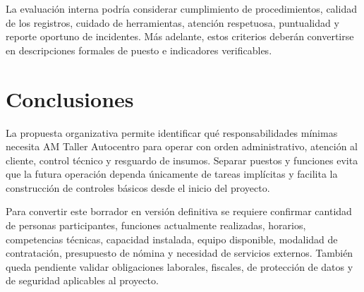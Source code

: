 {La evaluación interna podría considerar cumplimiento de procedimientos, calidad de los registros, cuidado de herramientas, atención respetuosa, puntualidad y reporte oportuno de incidentes. Más adelante, estos criterios deberán convertirse en descripciones formales de puesto e indicadores verificables.

\section{Conclusiones}

La propuesta organizativa permite identificar qué responsabilidades mínimas necesita AM Taller Autocentro para operar con orden administrativo, atención al cliente, control técnico y resguardo de insumos. Separar puestos y funciones evita que la futura operación dependa únicamente de tareas implícitas y facilita la construcción de controles básicos desde el inicio del proyecto.

Para convertir este borrador en versión definitiva se requiere confirmar cantidad de personas participantes, funciones actualmente realizadas, horarios, competencias técnicas, capacidad instalada, equipo disponible, modalidad de contratación, presupuesto de nómina y necesidad de servicios externos. También queda pendiente validar obligaciones laborales, fiscales, de protección de datos y de seguridad aplicables al proyecto.
}

